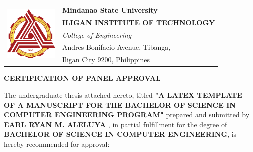 


\chapter*{}
    \thispagestyle{empty}


    \begin{table}[ht]
        \begin{tabular}{ll}
        \multirow{5}{*}{\includegraphics[width=1in]{images/msuiit_logo.png}} 
                             & \quad \textbf{Mindanao State University} \\
                             & \quad \textbf{ILIGAN INSTITUTE OF TECHNOLOGY}    \\
                             & \quad \textit{College of Engineering}   \\
                             & \quad Andres Bonifacio Avenue, Tibanga, \\
                             & \quad Iligan City 9200, Philippines  
        \end{tabular}
    \end{table}

    \begin{center}
        \textbf{CERTIFICATION OF PANEL APPROVAL}   
    \end{center}


    
    The undergraduate thesis attached hereto, titled 
    \textbf{
        "A LATEX TEMPLATE OF A MANUSCRIPT FOR THE BACHELOR OF SCIENCE IN COMPUTER ENGINEERING PROGRAM"
    } 
    prepared and submitted by 
    \textbf{
        EARL RYAN M. ALELUYA
    },
    in partial fulfillment for the degree of \textbf{BACHELOR OF SCIENCE IN COMPUTER ENGINEERING}, is hereby recommended for approval:


